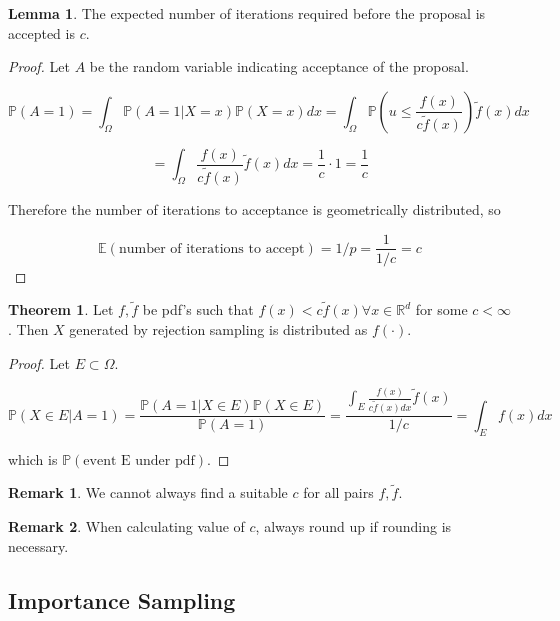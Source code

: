 \documentclass[12pt,a4paper]{article}
\theoremstyle{definition}
\newtheorem{theorem}[definition]{Theorem}
\newtheorem{lemma}[definition]{Lemma}
\newtheorem*{remark}{Remark}
\begin{document}
\begin{lemma}
	The expected number of iterations required before the proposal is accepted is $c$.
\end{lemma}

\begin{proof}
	Let $A$ be the random variable indicating acceptance of the proposal.
	
	\[ \mathbb{P}(A = 1) = \int_{\Omega} \mathbb{P}(A = 1 | X = x) \mathbb{P}(X = x) dx = \int_{\Omega} \mathbb{P}(u \le \frac{f(x)}{c \tilde{f}(x)}) \tilde{f}(x) dx \]

	\[ = \int_{\Omega} \frac{f(x)}{c \tilde{f}(x)} \tilde{f}(x) dx = \frac{1}{c} \cdot 1 = \frac{1}{c} \]

	Therefore the number of iterations to acceptance is geometrically distributed, so

	\[\mathbb{E}(\text{number of iterations to accept}) = 1 / p = \frac{1}{1 / c} = c\]
\end{proof}

\begin{theorem}
	Let $f, \tilde{f}$ be pdf's such that $f(x) < c \tilde{f}(x) \forall x \in \mathbb{R}^d$ for some $c < \infty$. Then $X$ generated by rejection sampling is distributed as $f(\cdot)$.
\end{theorem}

\begin{proof}
	Let $E \subset \Omega$.
	
	\[ \mathbb{P}(X \in E | A = 1) = \frac{\mathbb{P}(A = 1 | X \in E) \mathbb{P}(X \in E)}{\mathbb{P}(A = 1)} = \frac{\int_E \frac{f(x)}{c \tilde{f}(x) dx} \tilde{f}(x)}{1 / c} = \int_E f(x) dx \]

	which is $\mathbb{P}(\text{event E under pdf})$.
\end{proof}

\begin{remark}
	We cannot always find a suitable $c$ for all pairs $f, \tilde{f}$.
\end{remark}

\begin{remark}
	When calculating value of $c$, always round up if rounding is necessary.
\end{remark}

\subsection{Importance Sampling}
\end{document}
